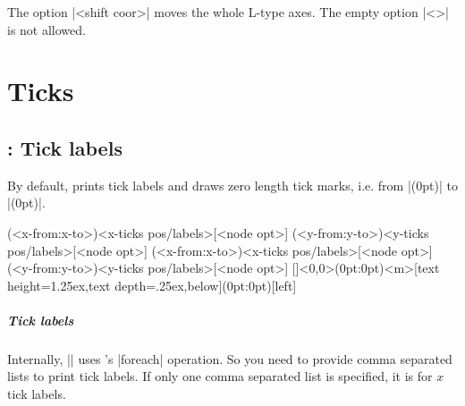 The option |<shift coor>| moves the whole L-type axes.
The empty option |<>| is not allowed.

\begin{tzcode}{.3}
\end{tzcode}



\chapter{Ticks}
\label{c:ticks}


\section{\protect\cmd{\tzticks}: Tick labels}
\label{s:tzticks}

By default, \icmd{\tzticks} prints tick labels and draws zero length tick marks, i.e. from |(0pt)| to |(0pt)|.

\begin{tzdef}{}
\tzticks(<x-from:x-to>){<x-ticks pos/labels>}[<node opt>]
        (<y-from:y-to>){<y-ticks pos/labels>}[<node opt>]
        (<x-from:x-to>){<x-ticks pos/labels>}[<node opt>]
        (<y-from:y-to>){<y-ticks pos/labels>}[<node opt>]
  []<0,0>(0pt:0pt){<m>}[text height=1.25ex,text depth=.25ex,below](0pt:0pt){}[left]
\end{tzdef}

\paragraph{Tick labels}
Internally, |\tzticks| uses \Tikz's |foreach| operation.
So you need to provide comma separated lists to print tick labels.
If only one comma separated list is specified, it is for $x$ tick labels.

\begin{tzcode}{.3}
{}
\end{tzcode}


